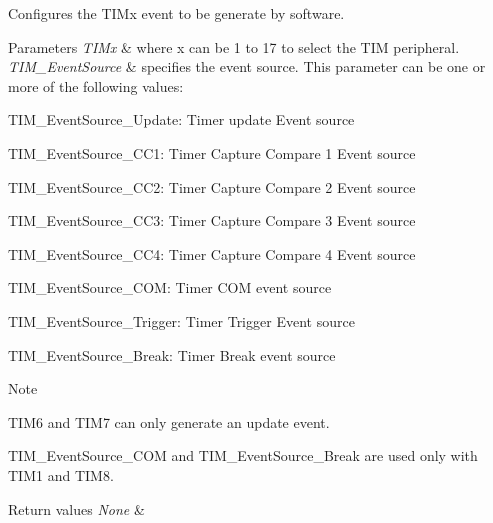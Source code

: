 Configures the T\+I\+Mx event to be generate by software. 


\begin{DoxyParams}{Parameters}
{\em T\+I\+Mx} & where x can be 1 to 17 to select the T\+IM peripheral. \\
\hline
{\em T\+I\+M\+\_\+\+Event\+Source} & specifies the event source. This parameter can be one or more of the following values\+:\\
\hline
\end{DoxyParams}
\begin{DoxyItemize}
\item T\+I\+M\+\_\+\+Event\+Source\+\_\+\+Update\+: Timer update Event source \item T\+I\+M\+\_\+\+Event\+Source\+\_\+\+C\+C1\+: Timer Capture Compare 1 Event source \item T\+I\+M\+\_\+\+Event\+Source\+\_\+\+C\+C2\+: Timer Capture Compare 2 Event source \item T\+I\+M\+\_\+\+Event\+Source\+\_\+\+C\+C3\+: Timer Capture Compare 3 Event source \item T\+I\+M\+\_\+\+Event\+Source\+\_\+\+C\+C4\+: Timer Capture Compare 4 Event source \item T\+I\+M\+\_\+\+Event\+Source\+\_\+\+C\+OM\+: Timer C\+OM event source\end{DoxyItemize}
\begin{DoxyItemize}
\item T\+I\+M\+\_\+\+Event\+Source\+\_\+\+Trigger\+: Timer Trigger Event source \item T\+I\+M\+\_\+\+Event\+Source\+\_\+\+Break\+: Timer Break event source \begin{DoxyNote}{Note}

\begin{DoxyItemize}
\item T\+I\+M6 and T\+I\+M7 can only generate an update event.
\item T\+I\+M\+\_\+\+Event\+Source\+\_\+\+C\+OM and T\+I\+M\+\_\+\+Event\+Source\+\_\+\+Break are used only with T\+I\+M1 and T\+I\+M8.
\end{DoxyItemize}
\end{DoxyNote}

\begin{DoxyRetVals}{Return values}
{\em None} & \\
\hline
\end{DoxyRetVals}
\end{DoxyItemize}
\mbox{\label{group___t_i_m___exported___functions_ga29eb9f7151ceea94c3988539a5ee91cf}} 
